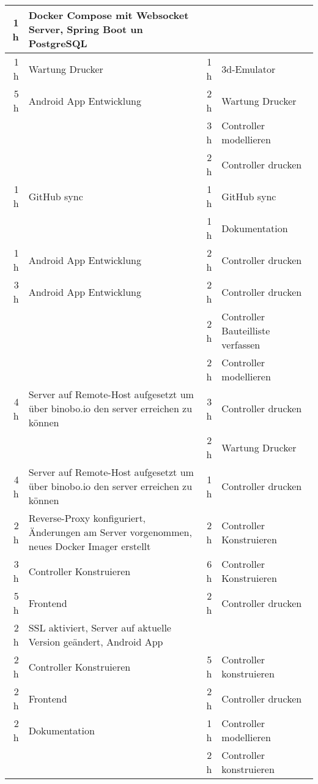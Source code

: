 \begin{table}[htbp]
\begin{tabular}{|r|l|r|l|}
    1 h   & Docker Compose mit Websocket Server, Spring Boot un PostgreSQL &       &  \\
    \hline
    1 h   & Wartung Drucker & 1 h   &  3d-Emulator \\
    \hline
    5 h   & Android App Entwicklung & 2 h   & Wartung Drucker \\
    \hline
          &       & 3 h   & Controller modellieren \\
    \hline
          &       & 2 h   & Controller drucken \\
    \hline
    1 h   & GitHub sync & 1 h   & GitHub sync \\
    \hline
          &       & 1 h   & Dokumentation \\
    \hline
    1 h   & Android App Entwicklung & 2 h   & Controller drucken \\
    \hline
    3 h   & Android App Entwicklung & 2 h   & Controller drucken \\
    \hline
          &       & 2 h   & Controller Bauteilliste verfassen \\
    \hline
          &       & 2 h   & Controller modellieren \\
    \hline
    4 h   & Server auf Remote-Host aufgesetzt um über binobo.io den server erreichen zu können & 3 h   & Controller drucken \\
    \hline
          &       & 2 h   & Wartung Drucker \\
    \hline
    4 h   & Server auf Remote-Host aufgesetzt um über binobo.io den server erreichen zu können & 1 h   & Controller drucken \\
    \hline
    2 h   & Reverse-Proxy konfiguriert, Änderungen am Server vorgenommen, neues Docker Imager erstellt & 2 h   & Controller Konstruieren \\
    \hline
    3 h   & Controller Konstruieren & 6 h   & Controller Konstruieren \\
    \hline
    5 h   & Frontend & 2 h   & Controller drucken \\
    \hline
    2 h   & SSL aktiviert, Server auf aktuelle Version geändert, Android App &       &  \\
    \hline
    2 h   & Controller Konstruieren & 5 h   & Controller konstruieren \\
    \hline
    2 h   & Frontend & 2 h   & Controller drucken \\
    \hline
    2 h   & Dokumentation & 1 h   & Controller modellieren \\
    \hline
          &       & 2 h   & Controller konstruieren \\

\end{tabular}
\end{table}
